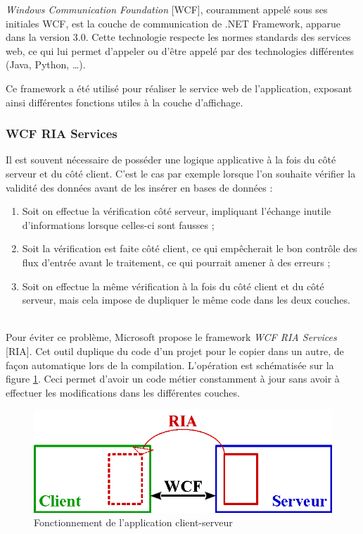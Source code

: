 
\textit{Windows Communication Foundation} [WCF], couramment appelé sous ses initiales WCF, est la couche de communication de .NET Framework, apparue dans la version 3.0.
Cette technologie respecte les normes standards des services web, ce qui lui permet d'appeler ou d'être appelé par des technologies différentes (Java, Python, \ldots).

Ce framework a été utilisé pour réaliser le service web de l'application, exposant ainsi différentes fonctions utiles à la couche d'affichage.


\subsubsection{WCF RIA Services}

Il est souvent nécessaire de posséder une logique applicative à la fois du côté serveur et du côté client.
C'est le cas par exemple lorsque l'on souhaite vérifier la validité des données avant de les insérer en bases de données :
\begin{enumerate}
	\item Soit on effectue la vérification côté serveur, impliquant l'échange inutile d'informations lorsque celles-ci sont fausses ;
	\item Soit la vérification est faite côté client, ce qui empêcherait le bon contrôle des flux d'entrée avant le traitement, ce qui pourrait amener à des erreurs ;
	\item Soit on effectue la même vérification à la fois du côté client et du côté serveur, mais cela impose de dupliquer le même code dans les deux couches.
\end{enumerate}
~~\\

Pour éviter ce problème, Microsoft propose le framework \textit{WCF RIA Services} [RIA].
Cet outil duplique du code d'un projet pour le copier dans un autre, de façon automatique lors de la compilation.
L'opération est schématisée sur la figure \ref{WCF_RIA_Services}.
Ceci permet d'avoir un code métier constamment à jour sans avoir à effectuer les modifications dans les différentes couches.
\begin{figure}[!h]
	\center
	\includegraphics[width=1\textwidth]{img/WCF_RIA_Services.png}
	\caption{Fonctionnement de l'application client-serveur}
	\label{WCF_RIA_Services}
\end{figure}

